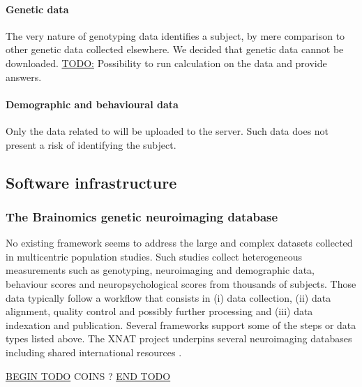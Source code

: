 \documentclass[review]{elsarticle}
\begin{document}
\paragraph{Genetic data} The very nature of genotyping data identifies a subject, by mere comparison to other genetic data collected elsewhere. We decided that genetic data cannot be downloaded. \underline{TODO:} Possibility to run calculation on the data and provide answers.

\paragraph{Demographic and behavioural data} Only the data related to \cite{Pinel2007}
will be uploaded to the server. Such data does not present a risk of identifying the subject.


\subsection{Software infrastructure}

\subsubsection{The Brainomics genetic neuroimaging database}

No existing framework seems to address the large and complex datasets collected in multicentric population studies. Such studies collect heterogeneous measurements such as genotyping, neuroimaging and demographic data, behaviour scores and neuropsychological scores from thousands of subjects. Those data typically follow a workflow that consists in (i) data collection, (ii) data alignment, quality control and possibly further processing and (iii) data indexation and publication. Several frameworks support some of the steps or data types listed above. The XNAT project \cite{XNAT2007} underpins several neuroimaging databases including shared international resources \cite{HBP2012}.

\underline{BEGIN TODO}
COINS ?
\underline{END TODO}
\end{document}
